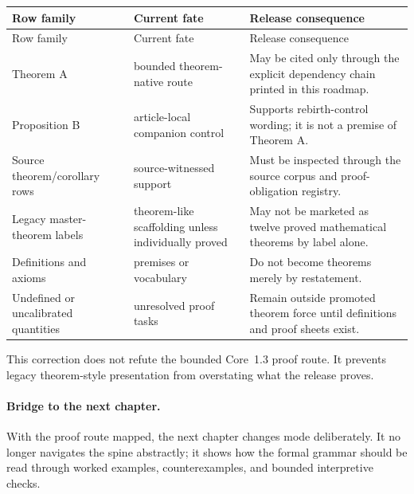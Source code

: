 \begin{longtable}{@{}p{}p{}p{}@{}}
\toprule
Row family & Current fate & Release consequence \\
\midrule
\endfirsthead
\toprule
Row family & Current fate & Release consequence \\
\midrule
\endhead
Theorem A & bounded theorem-native route & May be cited only through the explicit dependency chain printed in this roadmap. \\
Proposition B & article-local companion control & Supports rebirth-control wording; it is not a premise of Theorem A. \\
Source theorem/corollary rows & source-witnessed support & Must be inspected through the source corpus and proof-obligation registry. \\
Legacy master-theorem labels & theorem-like scaffolding unless individually proved & May not be marketed as twelve proved mathematical theorems by label alone. \\
Definitions and axioms & premises or vocabulary & Do not become theorems merely by restatement. \\
Undefined or uncalibrated quantities & unresolved proof tasks & Remain outside promoted theorem force until definitions and proof sheets exist. \\
\bottomrule
\end{longtable}

This correction does not refute the bounded Core~1.3 proof route. It prevents
legacy theorem-style presentation from overstating what the release proves.

\paragraph{Bridge to the next chapter.}
With the proof route mapped, the next chapter changes mode deliberately. It no
longer navigates the spine abstractly; it shows how the formal grammar should
be read through worked examples, counterexamples, and bounded interpretive
checks.

\clearpage
